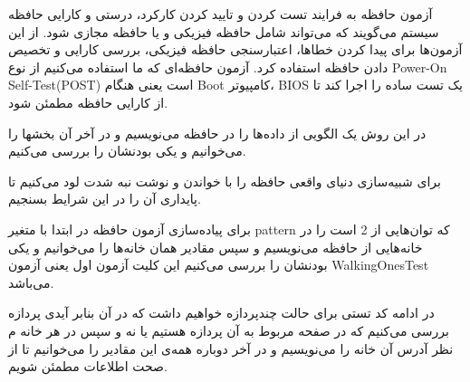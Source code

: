 




آزمون حافظه به فرایند تست کردن و تایید کردن کارکرد، درستی و کارایی حافظه سیستم می‌گویند که می‌تواند شامل حافظه فیزیکی و یا حافظه مجازی شود. از این آزمون‌ها برای پیدا کردن خطاها، اعتبارسنجی حافظه فیزیکی، بررسی کارایی و تخصیص دادن حافظه استفاده 
کرد. آزمون حافظه‌ای که ما استفاده می‌کنیم از نوع Power-On Self-Test(POST) است یعنی 
هنگام Boot کامپیوتر، BIOS یک تست ساده را اجرا کند تا از کارایی حافظه مطمئن شود.



در این روش یک الگویی از داده‌ها را در حافظه می‌نویسیم و در آخر آن بخشها را می‌خوانیم و یکی بودنشان را بررسی می‌کنیم.


برای شبیه‌سازی دنیای واقعی حافظه را  با خواندن و نوشت نبه شدت لود می‌کنیم تا پایداری آن را در این شرایط بسنجیم.


برای پیاده‌سازی آزمون حافظه در ابتدا با متغیر pattern که توان‌هایی از 2 است را در خانه‌هایی از حافظه می‌نویسیم و سپس مقادیر همان خانه‌ها را می‌خوانیم و یکی بودنشان را بررسی می‌کنیم این کلیت آزمون اول یعنی آزمون WalkingOnesTest می‌باشد.

در ادامه کد تستی برای حالت چندپردازه خواهیم داشت که در آن بنابر آیدی پردازه بررسی می‌کنیم که در صفحه مربوط به آن پردازه هستیم یا نه و سپس در هر خانه م نظر آدرس آن خانه را می‌نویسیم و در آخر دوباره همه‌ی این مقادیر را می‌خوانیم تا از صحت اطلاعات مطمئن شویم.

